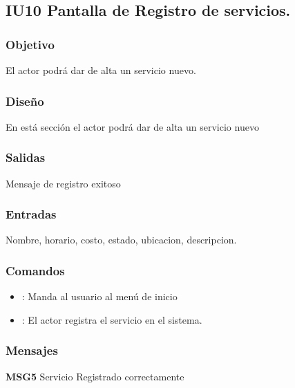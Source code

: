 \subsection{IU10 Pantalla de Registro de servicios.}

\subsubsection{Objetivo}
	El actor podrá dar de alta un servicio nuevo.

\subsubsection{Diseño}
	En está sección el actor podrá dar de alta un servicio nuevo


\subsubsection{Salidas}

	Mensaje de registro exitoso

\subsubsection{Entradas}
Nombre, horario, costo, estado, ubicacion, descripcion.

\subsubsection{Comandos}
\begin{itemize}
	\item {}: Manda al usuario al menú de inicio
	\item {}: El actor registra el servicio en el sistema.
\end{itemize}

\subsubsection{Mensajes}
	\begin{Citemize}
		\item {\bf MSG5} Servicio Registrado correctamente
	\end{Citemize}

